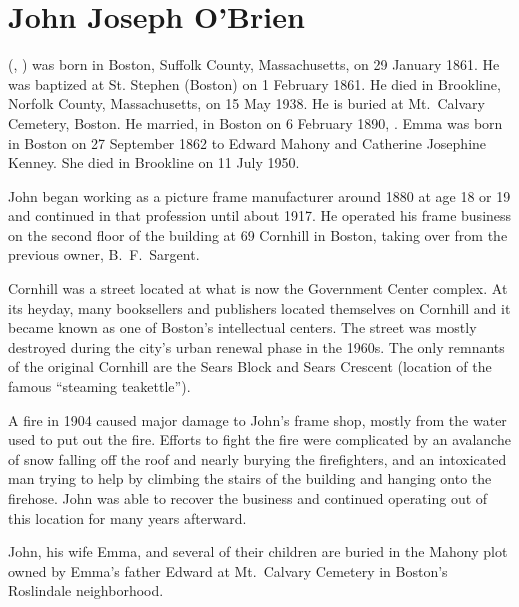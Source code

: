 \section{John Joseph O'Brien}

 (, ) was born in Boston, Suffolk County, Massachusetts, on 29 January 1861.\cite{John3OBrienBirth} He was baptized at St. Stephen (Boston) on 1 February 1861.\cite{John3OBrienBaptism} He died in Brookline, Norfolk County, Massachusetts, on 15 May 1938.\cite{John3OBrienDeath} He is buried at Mt.\ Calvary Cemetery, Boston.\cite{John3OBrienBurial} He married, in Boston on 6 February 1890, .\cite{John3OBrienMarriage} Emma was born in Boston on 27 September 1862 to Edward Mahony and Catherine Josephine Kenney.\cite{EmmaMahonyBaptism} She died in Brookline on 11 July 1950.\cite{EmmaMahonyDeath}

John began working as a picture frame manufacturer around 1880\cite{John3OBrien1880} at age 18 or 19 and continued in that profession until about 1917.\cite{John3OBrien1916} He operated his frame business on the second floor of the building at 69 Cornhill in Boston,\cite{John3OBrien1916,FrameShopFire} taking over from the previous owner, B.\ F.\ Sargent.\cite{PictureFrameLabel}

Cornhill was a street located at what is now the Government Center complex. At its heyday, many booksellers and publishers located themselves on Cornhill and it became known as one of Boston's intellectual centers.\cite{Cornhill} The street was mostly destroyed during the city's urban renewal phase in the 1960s. The only remnants of the original Cornhill are the Sears Block and Sears Crescent (location of the famous ``steaming teakettle'').\cite{Cornhill} 

A fire in 1904 caused major damage to John's frame shop, mostly from the water used to put out the fire. Efforts to fight the fire were complicated by an avalanche of snow falling off the roof and nearly burying the firefighters, and an intoxicated man trying to help by climbing the stairs of the building and hanging onto the firehose.\cite{FrameShopFire} John was able to recover the business and continued operating out of this location for many years afterward.\cite{John3OBrien1916}

John, his wife Emma, and several of their children are buried in the Mahony plot owned by Emma's father Edward at Mt.\ Calvary Cemetery in Boston's Roslindale neighborhood.\cite{John3OBrienBurial}

